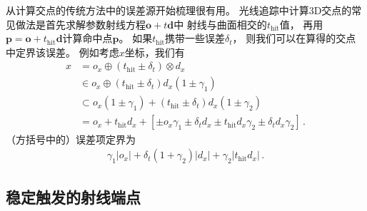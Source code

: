 从计算交点的传统方法中的误差源开始梳理很有用。
光线追踪中计算3D交点的常见做法是首先求解参数射线方程$\bm o+t\bm d$中
射线与曲面相交的$t_{\text{hit}}$值，
再用$\bm p=\bm o+t_{\text{hit}}\bm d$计算命中点$\bm p$。
如果$t_{\text{hit}}$携带一些误差$\delta_t$，
则我们可以在算得的交点中定界该误差。
例如考虑$x$坐标，我们有
\begin{align*}
    x & =o_x\oplus(t_{\text{hit}}\pm\delta_t)\otimes d_x                                                              \\
      & \in o_x\oplus(t_{\text{hit}}\pm\delta_t)d_x(1\pm\gamma_1)                                                     \\
      & \subset o_x(1\pm\gamma_1)+(t_{\text{hit}}\pm\delta_t)d_x(1\pm\gamma_2)                                        \\
      & =o_x+t_{\text{hit}}d_x+[\pm o_x\gamma_1\pm\delta_td_x\pm t_{\text{hit}}d_x\gamma_2\pm\delta_td_x\gamma_2]\, .
\end{align*}
（方括号中的）误差项定界为
\begin{align}\label{eq:3.13}
    \gamma_1|o_x|+\delta_t(1+\gamma_2)|d_x|+\gamma_2|t_{\text{hit}}d_x|\, .
\end{align}

\subsection{稳定触发的射线端点}\label{sub:稳定触发的射线端点}